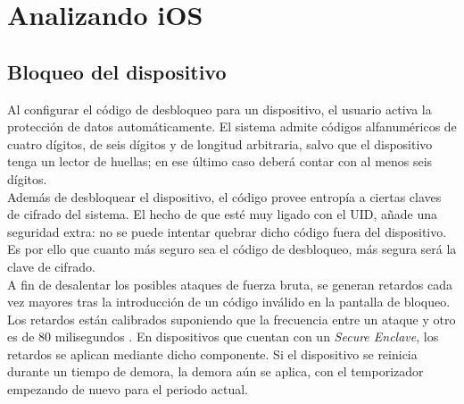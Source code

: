\section{Analizando iOS}
\subsection{Bloqueo del dispositivo}
Al configurar el código de desbloqueo para un dispositivo, el usuario activa la protección de datos automáticamente. El sistema admite códigos alfanuméricos de cuatro dígitos, de seis dígitos y de longitud arbitraria, salvo que el dispositivo tenga un lector de huellas; en ese último caso deberá contar con al menos seis dígitos.\\
Además de desbloquear el dispositivo, el código provee entropía a ciertas claves de cifrado del sistema. El hecho de que esté muy ligado con el UID, añade una seguridad extra: no se puede intentar quebrar dicho código fuera del dispositivo. Es por ello que cuanto más seguro sea el código de desbloqueo, más segura será la clave de cifrado.\\
A fin de desalentar los posibles ataques de fuerza bruta, se generan retardos cada vez mayores tras la introducción de un código inválido en la pantalla de bloqueo. Los retardos están calibrados suponiendo que la frecuencia entre un ataque y otro es de 80 milisegundos \cite{asg}. En dispositivos que cuentan con un \textit{Secure Enclave}, los retardos se aplican mediante dicho componente. Si el dispositivo se reinicia durante un tiempo de demora, la demora aún se aplica, con el temporizador empezando de nuevo para el periodo actual.
